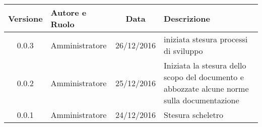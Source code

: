 
\begin{center}
	\begin{tabular}{cp{3cm}cp{3cm}}
	\textbf{Versione} & \textbf{Autore e Ruolo} & \textbf{Data} & \textbf{Descrizione} \\ \hline
	0.0.3 & {\MM} Amministratore & 26/12/2016 & iniziata stesura processi di sviluppo \\ \hline
	0.0.2 & {\GG} Amministratore & 25/12/2016 & Iniziata la stesura dello scopo del documento e abbozzate alcune norme sulla documentazione \\ \hline
	0.0.1 & {\MM} Amministratore & 24/12/2016 & Stesura scheletro \\ \hline
	\end{tabular}
\end{center}
